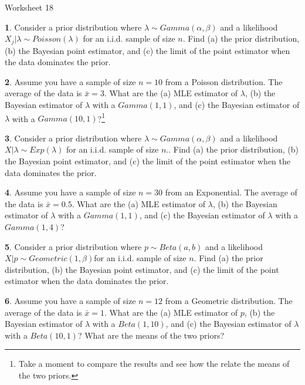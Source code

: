 \documentclass{tufte-handout}
\begin{document}
\justify

{\LARGE Worksheet 18}

\vspace*{18pt}


\textbf{1}. Consider a prior distribution where $\lambda \sim Gamma(\alpha, \beta)$ and a 
likelihood $X_j|\lambda \sim Poisson(\lambda)$ for an i.i.d. sample of size $n$.
Find (a) the prior distribution, (b) the Bayesian point estimator, and (c) the
limit of the point estimator when the data dominates the prior.

\textbf{2}. Assume you have a sample of size $n = 10$ from a Poisson distribution. The 
average of the data is $\bar{x} = 3$. What are the (a) MLE estimator of $\lambda$,
(b) the Bayesian estimator of $\lambda$ with a $Gamma(1, 1)$, and (c) the
Bayesian estimator of $\lambda$ with a $Gamma(10, 1)$?\footnote{
  Take a moment to compare the results and see how the relate the means of the
  two priors.
}

\textbf{3}. Consider a prior distribution where $\lambda \sim Gamma(\alpha, \beta)$ and a 
likelihood $X|\lambda \sim Exp(\lambda)$ for an i.i.d. sample of size $n$..
Find (a) the prior distribution, (b) the Bayesian point estimator, and (c) the
limit of the point estimator when the data dominates the prior.

\textbf{4}. Assume you have a sample of size $n = 30$ from an Exponential. The 
average of the data is $\bar{x} = 0.5$. What are the (a) MLE estimator of $\lambda$,
(b) the Bayesian estimator of $\lambda$ with a $Gamma(1, 1)$, and (c) the
Bayesian estimator of $\lambda$ with a $Gamma(1, 4)$?

\textbf{5}. Consider a prior distribution where $p \sim Beta(a, b)$ and a 
likelihood $X|p \sim Geometric(1, \beta)$for an i.i.d. sample of size $n$.
Find (a) the prior distribution, (b) the Bayesian point estimator, and (c) the
limit of the point estimator when the data dominates the prior.

\textbf{6}. Assume you have a sample of size $n = 12$ from a Geometric distribution. The 
average of the data is $\bar{x} = 1$. What are the (a) MLE estimator of $p$,
(b) the Bayesian estimator of $\lambda$ with a $Beta(1, 10)$, and (c) the
Bayesian estimator of $\lambda$ with a $Beta(10, 1)$? What are the means of
the two priors?
\end{document}
